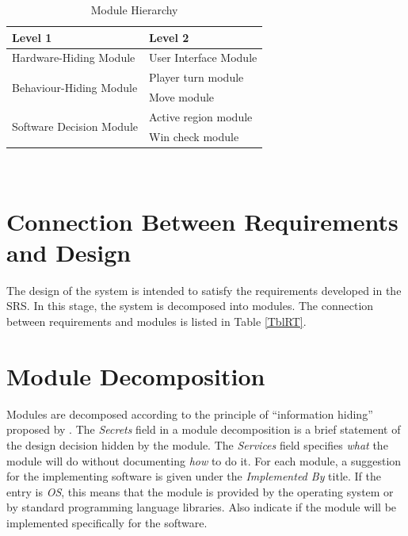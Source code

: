 \documentclass[12pt, titlepage]{article}
\begin{document}
\begin{table}[h!]
\centering
\begin{tabular}{p{} p{}}
\toprule
\textbf{Level 1} & \textbf{Level 2}\\
\midrule

{Hardware-Hiding Module} & User Interface Module \\
\midrule

\multirow{2}{0.3\textwidth}{Behaviour-Hiding Module} & Player turn module\\
& Move module\\
\midrule

\multirow{2}{0.3\textwidth}{Software Decision Module} & {Active region module}\\
& Win check module\\
\bottomrule

\end{tabular}
\caption{Module Hierarchy}
\label{TblMH}
\end{table}

 \\

\section{Connection Between Requirements and Design} \label{SecConnection}

The design of the system is intended to satisfy the requirements developed in
the SRS. In this stage, the system is decomposed into modules. The connection
between requirements and modules is listed in Table \ref{TblRT}.

\section{Module Decomposition} \label{SecMD}

Modules are decomposed according to the principle of ``information hiding''
proposed by \citet{ParnasEtAl1984}. The \emph{Secrets} field in a module
decomposition is a brief statement of the design decision hidden by the
module. The \emph{Services} field specifies \emph{what} the module will do
without documenting \emph{how} to do it. For each module, a suggestion for the
implementing software is given under the \emph{Implemented By} title. If the
entry is \emph{OS}, this means that the module is provided by the operating
system or by standard programming language libraries.  Also indicate if the
module will be implemented specifically for the software.
\end{document}
